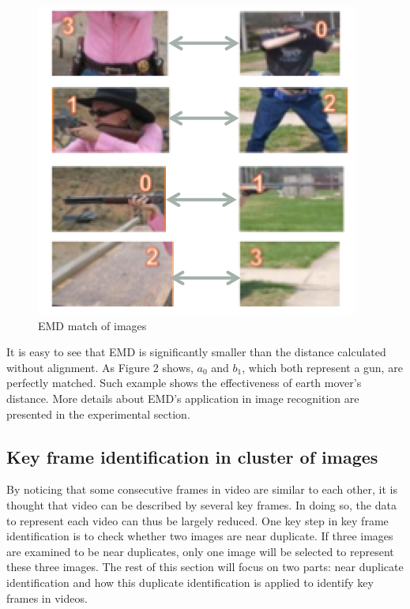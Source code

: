 \begin{figure}[!ht]
\centering
	\includegraphics[scale = 0.8]{./image_EMD.png}
\caption{EMD match of images}
\end{figure}

\noindent It is easy to see that EMD is significantly smaller than the distance calculated without alignment. As Figure 2 shows, $a_0$ and $b_1$, which both represent a gun, are perfectly matched. Such example shows the effectiveness of earth mover's distance. More details about EMD's application in image recognition are presented in the experimental section.

\subsection {Key frame identification in cluster of images}
By noticing that some consecutive frames in video are similar to each other, it is thought that video can be described by several key frames. In doing so, the data to represent each video can thus be largely reduced. One key step in key frame identification is to check whether two images are near duplicate. If three images are examined to be near duplicates, only one image will be selected to represent these three images. The rest of this section will focus on two parts: near duplicate identification and how this duplicate identification is applied to identify key frames in videos.

